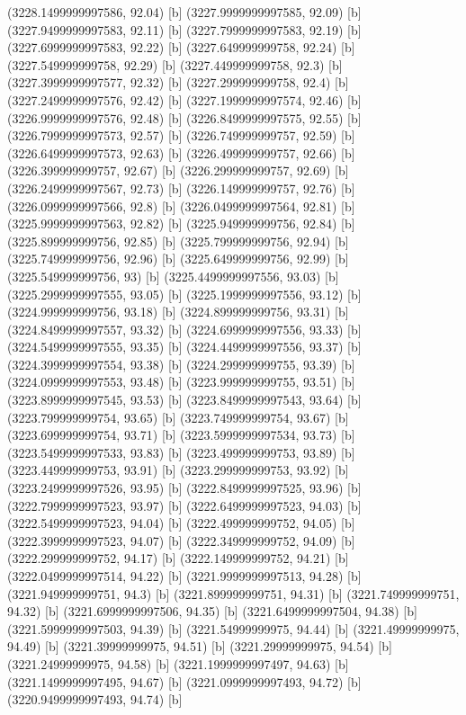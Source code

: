 {{{(3228.1499999997586, 92.04) [b] 
(3227.9999999997585, 92.09) [b] 
(3227.9499999997583, 92.11) [b] 
(3227.7999999997583, 92.19) [b] 
(3227.6999999997583, 92.22) [b] 
(3227.649999999758, 92.24) [b] 
(3227.549999999758, 92.29) [b] 
(3227.449999999758, 92.3) [b] 
(3227.3999999997577, 92.32) [b] 
(3227.299999999758, 92.4) [b] 
(3227.2499999997576, 92.42) [b] 
(3227.1999999997574, 92.46) [b] 
(3226.9999999997576, 92.48) [b] 
(3226.8499999997575, 92.55) [b] 
(3226.7999999997573, 92.57) [b] 
(3226.749999999757, 92.59) [b] 
(3226.6499999997573, 92.63) [b] 
(3226.499999999757, 92.66) [b] 
(3226.399999999757, 92.67) [b] 
(3226.299999999757, 92.69) [b] 
(3226.2499999997567, 92.73) [b] 
(3226.149999999757, 92.76) [b] 
(3226.0999999997566, 92.8) [b] 
(3226.0499999997564, 92.81) [b] 
(3225.9999999997563, 92.82) [b] 
(3225.949999999756, 92.84) [b] 
(3225.899999999756, 92.85) [b] 
(3225.799999999756, 92.94) [b] 
(3225.749999999756, 92.96) [b] 
(3225.649999999756, 92.99) [b] 
(3225.549999999756, 93) [b] 
(3225.4499999997556, 93.03) [b] 
(3225.2999999997555, 93.05) [b] 
(3225.1999999997556, 93.12) [b] 
(3224.999999999756, 93.18) [b] 
(3224.899999999756, 93.31) [b] 
(3224.8499999997557, 93.32) [b] 
(3224.6999999997556, 93.33) [b] 
(3224.5499999997555, 93.35) [b] 
(3224.4499999997556, 93.37) [b] 
(3224.3999999997554, 93.38) [b] 
(3224.299999999755, 93.39) [b] 
(3224.0999999997553, 93.48) [b] 
(3223.999999999755, 93.51) [b] 
(3223.8999999997545, 93.53) [b] 
(3223.8499999997543, 93.64) [b] 
(3223.799999999754, 93.65) [b] 
(3223.749999999754, 93.67) [b] 
(3223.699999999754, 93.71) [b] 
(3223.5999999997534, 93.73) [b] 
(3223.5499999997533, 93.83) [b] 
(3223.499999999753, 93.89) [b] 
(3223.449999999753, 93.91) [b] 
(3223.299999999753, 93.92) [b] 
(3223.2499999997526, 93.95) [b] 
(3222.8499999997525, 93.96) [b] 
(3222.7999999997523, 93.97) [b] 
(3222.6499999997523, 94.03) [b] 
(3222.5499999997523, 94.04) [b] 
(3222.499999999752, 94.05) [b] 
(3222.3999999997523, 94.07) [b] 
(3222.349999999752, 94.09) [b] 
(3222.299999999752, 94.17) [b] 
(3222.149999999752, 94.21) [b] 
(3222.0499999997514, 94.22) [b] 
(3221.9999999997513, 94.28) [b] 
(3221.949999999751, 94.3) [b] 
(3221.899999999751, 94.31) [b] 
(3221.749999999751, 94.32) [b] 
(3221.6999999997506, 94.35) [b] 
(3221.6499999997504, 94.38) [b] 
(3221.5999999997503, 94.39) [b] 
(3221.54999999975, 94.44) [b] 
(3221.49999999975, 94.49) [b] 
(3221.39999999975, 94.51) [b] 
(3221.29999999975, 94.54) [b] 
(3221.24999999975, 94.58) [b] 
(3221.1999999997497, 94.63) [b] 
(3221.1499999997495, 94.67) [b] 
(3221.0999999997493, 94.72) [b] 
(3220.9499999997493, 94.74) [b] 
}}}
